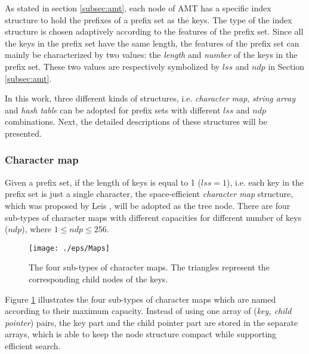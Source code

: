 \documentclass{article}
\begin{document}
As stated in section \ref{subsec:amt}, each node of AMT has a specific
index structure to hold the prefixes of a prefix set as the keys. The
type of the index structure is chosen adaptively according to the
features of the prefix set. Since all the keys in the prefix set have
the same length, the features of the prefix set can mainly be
characterized by two values: the \emph{length} and \emph{number} of
the keys in the prefix set. These two values are respectively
symbolized by $lss$ and $ndp$ in Section \ref{subsec:amt}.

In this work, three different kinds of structures,
i.e. \emph{character map}, \emph{string array} and \emph{hash table}
can be adopted for prefix sets with different $lss$ and $ndp$
combinations. Next, the detailed descriptions of these structures will
be presented.

\subsubsection{Character map}

Given a prefix set, if the length of keys is equal to 1 ($lss=1$),
i.e. each key in the prefix set is just a single character, the
space-efficient \emph{character map} structure, which was proposed by
Leis \cite{Leis2013}, will be adopted as the tree node. There are four
sub-types of character maps with different capacities for different
number of keys ($ndp$), where $1 \leq ndp \leq 256$.

\begin{figure}[htbp]
  \centering
  \texttt{[image: ./eps/Maps]}
  \caption{The four sub-types of character maps. The triangles
    represent the corresponding child nodes of the keys.}
  \label{fig:character map}
\end{figure}

Figure \ref{fig:character map} illustrates the four sub-types of
character maps which are named according to their maximum
capacity. Instead of using one array of (\emph{key, child pointer})
pairs, the key part and the child pointer part are stored in the
separate arrays, which is able to keep the node structure compact
while supporting efficient search.
\end{document}
